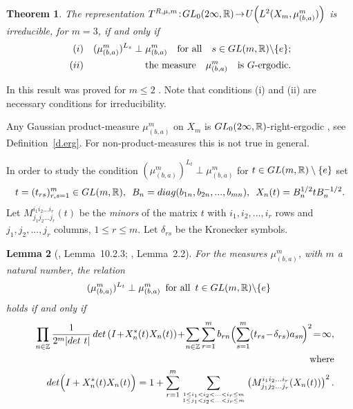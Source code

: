\documentclass[preprint,12pt]{elsarticle}
\newtheorem{thm}{Theorem}[section]
\newtheorem{lem}[thm]{Lemma}
\numberwithin{equation}{section}
\begin{document}
%
\begin{thm}
\label{5.t.irr} The representation $T^{R,\mu,m}\!:\!{\rm
GL}_0(2\infty,{\mathbb R})\!\rightarrow\! U\Big(L^2(X_m,\mu^m_{(b,a)})\Big)$ is
irreducible, for $m=3$, if and only if  
\begin{eqnarray*}
(i)&&(\mu^m_{(b,a)})^{L_{s}}\perp
\mu^m_{(b,a)}\quad\text {for all}\quad s\in {\rm GL}(m,{\mathbb
R})\backslash\{e\};\\
(ii)&&\text{the measure} \quad\mu^m_{(b,a)}\quad \text{is $G$-{\rm ergodic}}.
\end{eqnarray*}
\end{thm}
In {\rm \cite{Kos_B_09,KosJFA17}}
this result was proved for  $m\leq 2$ .
Note that conditions (i) and (ii) are necessary conditions for irreducibility.
%
\begin{rem}
Any Gaussian product-measure $\mu_{(b,a)}^m$ on $X_m$ is ${\rm
GL}_0(2\infty,{\mathbb R})$-right-ergodic \cite[\S 3, Corollary 1]{ShFDT67}, see Definition~\ref{d.erg}. For non-product-measures
this is not true in general.
\end{rem}
In order to study the condition $(\mu^m_{(b,a)})^{L_{t}}\perp
\mu^m_{(b,a)}$ for $t\in {\rm GL}(m,{\mathbb R})\setminus \{e\}$ set
\begin{equation}
\label{5.X_n(t)}
t=(t_{rs})_{r,s=1}^m\in{\rm GL}(m,{\mathbb R}), \,\,\,B_n={\rm
diag}(b_{1n},b_{2n},...,b_{mn}),\,\,\,X_n(t)=B_n^{1/2}tB_n^{-1/2}.
\end{equation}
Let  $M^{i_1i_2...i_r}_{j_1j_2...j_r}(t)$ be the {\it minors} of
the matrix $t$ with $i_1,i_2,...,i_r$ rows and $j_1,j_2,...,j_r$
columns, $1\leq r\leq m.$ Let $\delta_{rs}$ be the Kronecker
symbols.
%
\begin{lem}[\cite{Kos_B_09}, Lemma~10.2.3; \cite{KosJFA17}, Lemma~2.2]
\label{perp1} For the measures $\mu_{(b,a)}^m$, with  $m$ a natural number,
the relation
\begin{equation*}
 (\mu_{(b,a)}^m)^{L_t}\perp\mu_{(b,a)}^m\,\,\,\text{for all}\,\,\, t\in
 {\rm GL}(m,{\mathbb R})\backslash\{e\}\,\,
\end{equation*}
 holds if and only if
 \begin{eqnarray*}
 &&
\prod_{n\in {\mathbb Z}}\frac{1}{2^m\vert{\rm det}\,\,t\vert}\, {\rm
det}\left(I\!+\!X_n^*(t)X_n(t)\right)\!+\! \sum_{n\in {\mathbb
Z}}\sum_{r=1}^m
b_{rn}\Big(\!\sum_{s=1}^m(t_{rs}\!-\!\delta_{rs})a_{sn}\!\Big)^2
\!=\!\infty,\\
&&
\text{where}\\
&&
{\rm det}\Big(I+X_n^*(t)X_n(t)\Big)= 1+\sum_{r=1}^{m} \sum_{1\leq i_1<i_2<...<i_r\leq m\atop 1\leq
j_1<j_2<...<j_r\leq m}
\left(M^{i_1i_2...i_r}_{j_1j_2...j_r}(X_n(t))\right)^2.
\end{eqnarray*}
\end{lem}
\end{document}
